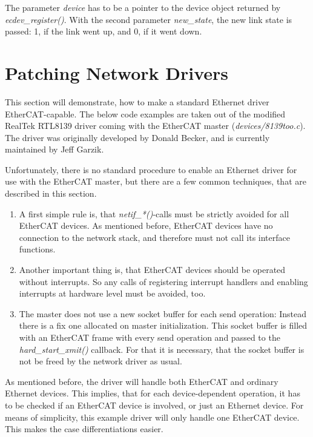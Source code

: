 \documentclass[a4paper,12pt,BCOR6mm,bibtotoc,idxtotoc]{scrbook}
\begin{document}
The parameter \textit{device} has to be a pointer to the device object
returned by \textit{ecdev\_\-register()}. With the second parameter
\textit{new\_state}, the new link state is passed: 1, if the link went
up, and 0, if it went down.


\section{Patching Network Drivers}
\label{sec:patching}

This section will demonstrate, how to make a standard Ethernet driver
EtherCAT-capable. The below code examples are taken out of the
modified RealTek RTL8139 driver coming with the EtherCAT master
(\textit{devices/8139too.c}). The driver was originally developed by
Donald Becker, and is currently maintained by Jeff Garzik.

Unfortunately, there is no standard procedure to enable an Ethernet
driver for use with the EtherCAT master, but there are a few common
techniques, that are described in this section.

\begin{enumerate}
\item A first simple rule is, that \textit{netif\_*()}-calls must be
  strictly avoided for all EtherCAT devices. As mentioned before,
  EtherCAT devices have no connection to the network stack, and
  therefore must not call its interface functions.
\item Another important thing is, that EtherCAT devices should be
  operated without interrupts. So any calls of registering interrupt
  handlers and enabling interrupts at hardware level must be avoided,
  too.
\item The master does not use a new socket buffer for each send
  operation: Instead there is a fix one allocated on master
  initialization. This socket buffer is filled with an EtherCAT frame
  with every send operation and passed to the
  \textit{hard\_start\_xmit()} callback. For that it is necessary,
  that the socket buffer is not be freed by the network driver as
  usual.
\end{enumerate}

As mentioned before, the driver will handle both EtherCAT and ordinary
Ethernet devices. This implies, that for each device-dependent
operation, it has to be checked if an EtherCAT device is involved, or
just an Ethernet device. For means of simplicity, this example driver
will only handle one EtherCAT device. This makes the case
differentiations easier.
\end{document}
